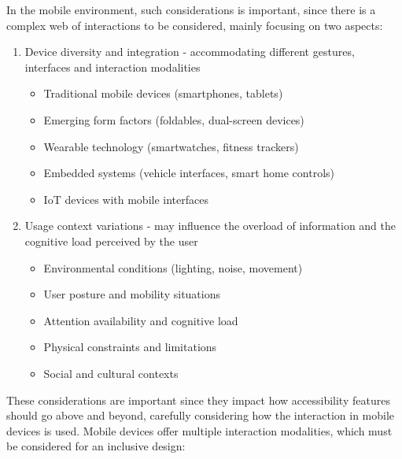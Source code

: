 In the mobile environment, such considerations is important, since there is a complex web of interactions to be considered, mainly focusing on two aspects:

\begin{enumerate}
    \item Device diversity and integration - accommodating different gestures, interfaces and interaction modalities
        \begin{itemize}
            \item Traditional mobile devices (smartphones, tablets)
            \item Emerging form factors (foldables, dual-screen devices)
            \item Wearable technology (smartwatches, fitness trackers)
            \item Embedded systems (vehicle interfaces, smart home controls)
            \item IoT devices with mobile interfaces
        \end{itemize}
    \item Usage context variations - may influence the overload of information and the cognitive load perceived by the user
        \begin{itemize}
            \item Environmental conditions (lighting, noise, movement)
            \item User posture and mobility situations
            \item Attention availability and cognitive load
            \item Physical constraints and limitations
            \item Social and cultural contexts
        \end{itemize}
\end{enumerate}

These considerations are important since they impact how accessibility features should go above and beyond, carefully considering how the interaction in mobile devices is used. Mobile devices offer multiple interaction modalities, which must be considered for an inclusive design:

